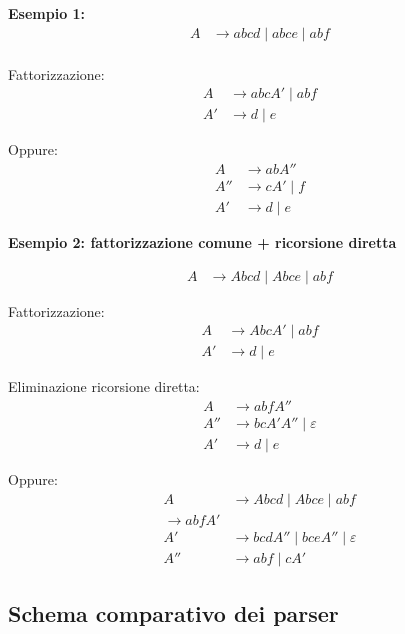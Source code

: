 \textbf{Esempio 1:}
\[
\begin{aligned}
A &\rightarrow abc d \mid abc e \mid abf \\
\end{aligned}
\]

\vspace{1em}
Fattorizzazione:
\[
\begin{aligned}
A &\rightarrow abc A' \mid abf \\
A' &\rightarrow d \mid e
\end{aligned}
\]

Oppure:
\[
\begin{aligned}
A &\rightarrow ab A'' \\
A'' &\rightarrow cA' \mid f \\
A' &\rightarrow d \mid e
\end{aligned}
\]


\textbf{Esempio 2: fattorizzazione comune + ricorsione diretta}

\[
\begin{aligned}
A &\rightarrow Abc d \mid Abc e \mid abf
\end{aligned}
\]

Fattorizzazione:
\[
\begin{aligned}
A &\rightarrow Abc A' \mid abf \\
A' &\rightarrow d \mid e
\end{aligned}
\]

Eliminazione ricorsione diretta:
\[
\begin{aligned}
A &\rightarrow abf A'' \\
A'' &\rightarrow bcA' A'' \mid \varepsilon \\
A' &\rightarrow d \mid e
\end{aligned}
\]

Oppure:
\[
\begin{aligned}
A &\rightarrow Abc d \mid Abc e \mid abf \\
\rightarrow abf A' \\
A' &\rightarrow bc d A'' \mid bc e A'' \mid \varepsilon \\
A'' &\rightarrow abf \mid cA'
\end{aligned}
\]



\subsection{Schema comparativo dei parser}

